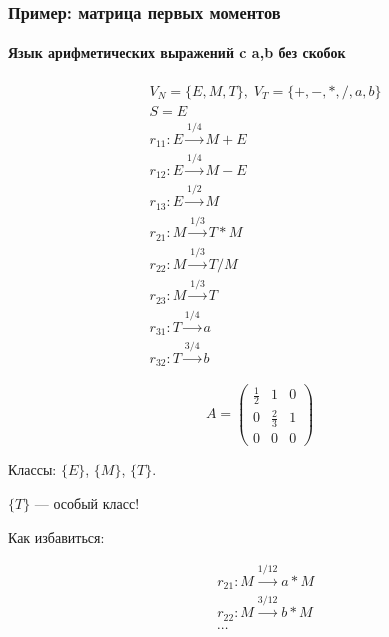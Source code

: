 \documentclass{beamer}
\begin{document}
	\begin{frame}
		\frametitle{Пример: матрица первых моментов}
		\framesubtitle{Язык арифметических выражений c a,b без скобок}
		\begin{multicols}{2}
			{\small
				\begin{equation*}
				\begin{split}
				&V_N = \{E, M, T\},\;V_T = \{+, -, *, /, a, b\}\\
				&S = E\\
				&r_{11} : E \xrightarrow{1/4} M + E \\
				&r_{12} : E \xrightarrow{1/4} M - E \\
				&r_{13} : E \xrightarrow{1/2} M \\
				&r_{21} : M \xrightarrow{1/3} T * M \\
				&r_{22} : M \xrightarrow{1/3} T / M \\
				&r_{23} : M \xrightarrow{1/3} T \\
				&r_{31} : T \xrightarrow{1/4} a \\
				&r_{32} : T \xrightarrow{3/4} b
				\end{split}
				\end{equation*}
			}
	
		$$
		A =
			\begin{pmatrix}
				\frac{1}{2} & 1 & 0 \\
				0 & \frac{2}{3} & 1 \\
				0 & 0 & 0
			\end{pmatrix}
		$$
		
		Классы: $\{E\}$, $\{M\}$, $\{T\}$.
		
		$\{T\}$ --- особый класс!
		
		Как избавиться:
		
		\begin{equation*}
		\begin{split}
		&r_{21} : M \xrightarrow{1/12} a * M\\
		&r_{22} : M \xrightarrow{3/12} b * M\\
		&\cdots
		\end{split}
		\end{equation*}
			
		\end{multicols}
	\end{frame}
	
\end{document}
